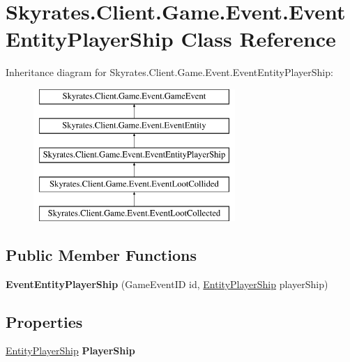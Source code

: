 \hypertarget{class_skyrates_1_1_client_1_1_game_1_1_event_1_1_event_entity_player_ship}{\section{Skyrates.\-Client.\-Game.\-Event.\-Event\-Entity\-Player\-Ship Class Reference}
\label{class_skyrates_1_1_client_1_1_game_1_1_event_1_1_event_entity_player_ship}
}
Inheritance diagram for Skyrates.\-Client.\-Game.\-Event.\-Event\-Entity\-Player\-Ship\-:\begin{figure}[H]
\begin{center}
\leavevmode
\includegraphics[height=5.000000cm]{class_skyrates_1_1_client_1_1_game_1_1_event_1_1_event_entity_player_ship}
\end{center}
\end{figure}
\subsection*{Public Member Functions}
\begin{DoxyCompactItemize}
\item 
\hypertarget{class_skyrates_1_1_client_1_1_game_1_1_event_1_1_event_entity_player_ship_a834396c60fe40f7782c5a8f506068d25}{{\bfseries Event\-Entity\-Player\-Ship} (Game\-Event\-I\-D id, \hyperlink{class_skyrates_1_1_client_1_1_entity_1_1_entity_player_ship}{Entity\-Player\-Ship} player\-Ship)}\label{class_skyrates_1_1_client_1_1_game_1_1_event_1_1_event_entity_player_ship_a834396c60fe40f7782c5a8f506068d25}

\end{DoxyCompactItemize}
\subsection*{Properties}
\begin{DoxyCompactItemize}
\item 
\hypertarget{class_skyrates_1_1_client_1_1_game_1_1_event_1_1_event_entity_player_ship_a6f84598b8e589eeb0e102fcda0a322b9}{\hyperlink{class_skyrates_1_1_client_1_1_entity_1_1_entity_player_ship}{Entity\-Player\-Ship} {\bfseries Player\-Ship}}\label{class_skyrates_1_1_client_1_1_game_1_1_event_1_1_event_entity_player_ship_a6f84598b8e589eeb0e102fcda0a322b9}

\end{DoxyCompactItemize}
